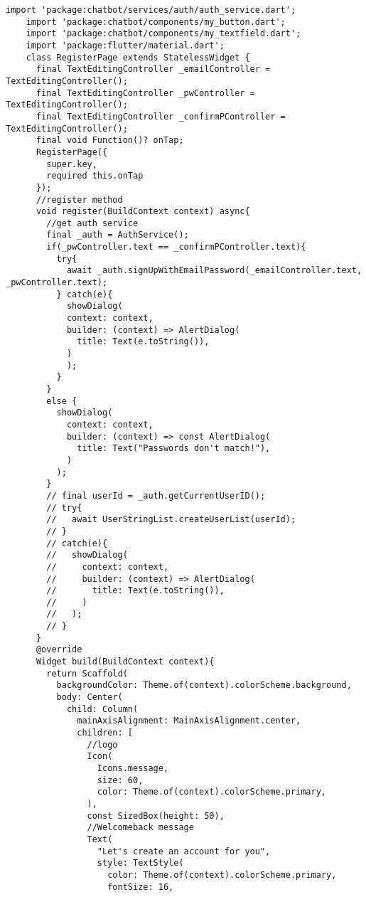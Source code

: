 \begin{lstlisting}[style=pythonstyle,caption={Codice del register\_page.py}, label={lst:register}]
    import 'package:chatbot/services/auth/auth_service.dart';
    import 'package:chatbot/components/my_button.dart';
    import 'package:chatbot/components/my_textfield.dart';
    import 'package:flutter/material.dart';
    class RegisterPage extends StatelessWidget {
      final TextEditingController _emailController = TextEditingController();
      final TextEditingController _pwController = TextEditingController();
      final TextEditingController _confirmPController = TextEditingController();
      final void Function()? onTap;
      RegisterPage({
        super.key,
        required this.onTap
      });
      //register method
      void register(BuildContext context) async{
        //get auth service
        final _auth = AuthService();
        if(_pwController.text == _confirmPController.text){
          try{
            await _auth.signUpWithEmailPassword(_emailController.text, _pwController.text);
          } catch(e){
            showDialog(
            context: context, 
            builder: (context) => AlertDialog(
              title: Text(e.toString()),
            )
            );
          }
        }
        else {
          showDialog(
            context: context, 
            builder: (context) => const AlertDialog(
              title: Text("Passwords don't match!"),
            )
          );
        }
        // final userId = _auth.getCurrentUserID();
        // try{
        //   await UserStringList.createUserList(userId);
        // }
        // catch(e){
        //   showDialog(
        //     context: context, 
        //     builder: (context) => AlertDialog(
        //       title: Text(e.toString()),
        //     )
        //   );
        // }
      }
      @override
      Widget build(BuildContext context){
        return Scaffold(
          backgroundColor: Theme.of(context).colorScheme.background,
          body: Center(
            child: Column(
              mainAxisAlignment: MainAxisAlignment.center,
              children: [
                //logo
                Icon(
                  Icons.message,
                  size: 60,
                  color: Theme.of(context).colorScheme.primary,
                ),
                const SizedBox(height: 50),
                //Welcomeback message
                Text(
                  "Let's create an account for you",
                  style: TextStyle(
                    color: Theme.of(context).colorScheme.primary,
                    fontSize: 16,

\end{lstlisting}
